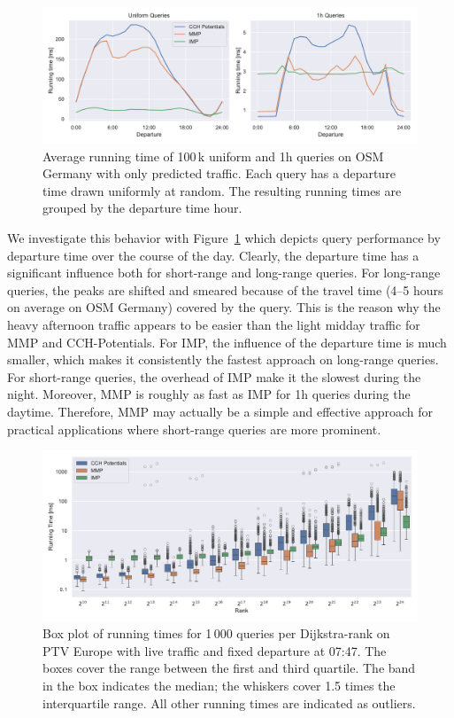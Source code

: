 \documentclass[a4paper,UKenglish,cleveref, autoref, thm-restate]{lipics-v2021}
\begin{document}
\begin{figure}[tb]
\centering
\includegraphics[width=\linewidth]{fig/perf_over_day.pdf}
\caption{
Average running time of 100\,k uniform and 1h queries on OSM Germany with only predicted traffic.
Each query has a departure time drawn uniformly at random.
The resulting running times are grouped by the departure time hour.
}\label{fig:by_dep}
\end{figure}

We investigate this behavior with Figure~\ref{fig:by_dep} which depicts query performance by departure time over the course of the day.
Clearly, the departure time has a significant influence both for short-range and long-range queries.
For long-range queries, the peaks are shifted and smeared because of the travel time (4--5 hours on average on OSM Germany) covered by the query.
This is the reason why the heavy afternoon traffic appears to be easier than the light midday traffic for MMP and CCH-Potentials.
For IMP, the influence of the departure time is much smaller, which makes it consistently the fastest approach on long-range queries.
For short-range queries, the overhead of IMP make it the slowest during the night.
Moreover, MMP is roughly as fast as IMP for 1h queries during the daytime.
Therefore, MMP may actually be a simple and effective approach for practical applications where short-range queries are more prominent.

\begin{figure}[!b]
\centering
\includegraphics[width=\linewidth]{fig/ranks.pdf}
\caption{
Box plot of running times for 1\,000 queries per Dijkstra-rank on PTV Europe with live traffic and fixed departure at 07:47.
The boxes cover the range between the first and third quartile.
The band in the box indicates the median; the whiskers cover 1.5 times the interquartile range.
All other running times are indicated as outliers.
}\label{fig:ranks}
\end{figure}
\end{document}
